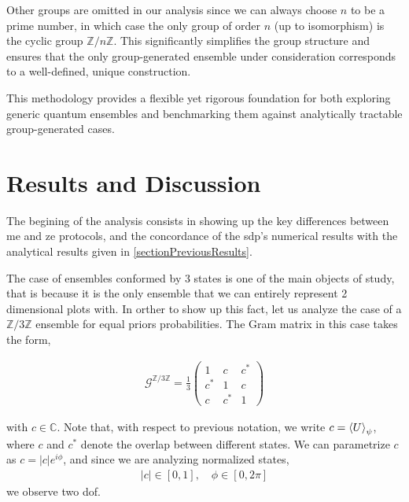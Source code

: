 \documentclass[12pt,letterpaper]{article}
\begin{document}
Other groups are omitted in our analysis since we can always choose $n$ to be a prime number, in which case the only group of order $n$ (up to isomorphism) is the cyclic group $\mathbb{Z}/n\mathbb{Z}$. This significantly simplifies the group structure and ensures that the only group-generated ensemble under consideration corresponds to a well-defined, unique construction.

This methodology provides a flexible yet rigorous foundation for both exploring generic quantum ensembles and benchmarking them against analytically tractable group-generated cases.

\newpage
\section{Results and Discussion}\label{sectionResultsAndDiscussion}

\hspace{20pt}The begining of the analysis consists in showing up the key differences between \gls{me} and \gls{ze} protocols, and the concordance of the \gls{sdp}'s numerical results with the analytical results given in \ref{sectionPreviousResults}.

The case of ensembles conformed by 3 states is one of the main objects of study, that is because it is the only ensemble that we can entirely represent 2 dimensional plots with. In orther to show up this fact, let us analyze the case of a $\mathbb{Z}/3\mathbb{Z}$ ensemble for equal priors probabilities. The Gram matrix in this case takes the form,

\begin{align*}
	\mathcal{G}^{\mathbb{Z}/3\mathbb{Z}}=\frac{1}{3}\begin{pmatrix}
		1 & c & c^*\\
		c^* & 1 & c\\
		c & c^* & 1
	\end{pmatrix}
\end{align*}

with $c \in \mathbb{C}$. Note that, with respect to previous notation, we write $c = \braket{U}_{\psi}$, where $c$ and $c^*$ denote the overlap between different states. We can parametrize $c$ as $c = |c|e^{i\phi}$, and since we are analyzing normalized states,
\begin{align*}
	|c|\in [0,1], \quad \phi\in[0,2\pi]
\end{align*}
we observe two \gls{dof}.
\end{document}
